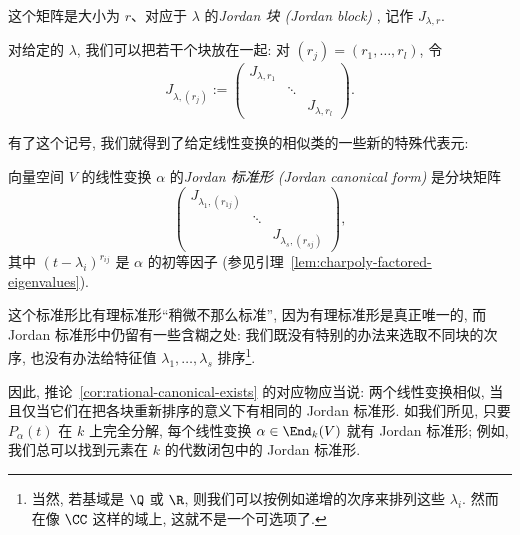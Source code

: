 \begin{definition}\label{def:jordan-block}
这个矩阵是大小为 $r$、对应于 $\lambda$ 的\emph{Jordan 块 (Jordan block)}
, 记作 $J_{\lambda,r}$.
\end{definition}

对给定的 $\lambda$, 我们可以把若干个块放在一起: 对 $(r_j)=(r_1,\ldots,r_l)$, 令
\[
J_{\lambda,(r_j)}:=
\begin{pmatrix}
J_{\lambda,r_1}&&\\
&\ddots&\\
&&J_{\lambda,r_l}
\end{pmatrix}.
\]

有了这个记号, 我们就得到了给定线性变换的相似类的一些新的特殊代表元:

\begin{definition}\label{def:jordan-canonical-form}
向量空间 $V$ 的线性变换 $\alpha$ 的\emph{Jordan 标准形 (Jordan canonical form)}
是分块矩阵
\[
\begin{pmatrix}
J_{\lambda_1,(r_{1j})}&&\\
&\ddots&\\
&&J_{\lambda_s,(r_{sj})}
\end{pmatrix},
\]
其中 $(t-\lambda_i)^{r_{ij}}$ 是 $\alpha$ 的初等因子 (参见引理~\ref{lem:charpoly-factored-eigenvalues}).
\end{definition}

这个标准形比有理标准形``稍微不那么标准'', 因为有理标准形是真正唯一的, 而 Jordan 标准形中仍留有一些含糊之处: 我们既没有特别的办法来选取不同块的次序, 也没有办法给特征值 $\lambda_1,\ldots,\lambda_s$ 排序\footnote{当然, 若基域是 $\Q$ 或 $\R$, 则我们可以按例如递增的次序来排列这些 $\lambda_i$. 然而在像 $\CC$ 这样的域上, 这就不是一个可选项了.}.

因此, 推论~\ref{cor:rational-canonical-exists} 的对应物应当说: 两个线性变换相似, 当且仅当它们在把各块重新排序的意义下有相同的 Jordan 标准形. 如我们所见, 只要 $P_\alpha(t)$ 在 $k$ 上完全分解, 每个线性变换 $\alpha\in\End_k(V)$ 就有 Jordan 标准形; 例如, 我们总可以找到元素在 $k$ 的代数闭包中的 Jordan 标准形.

